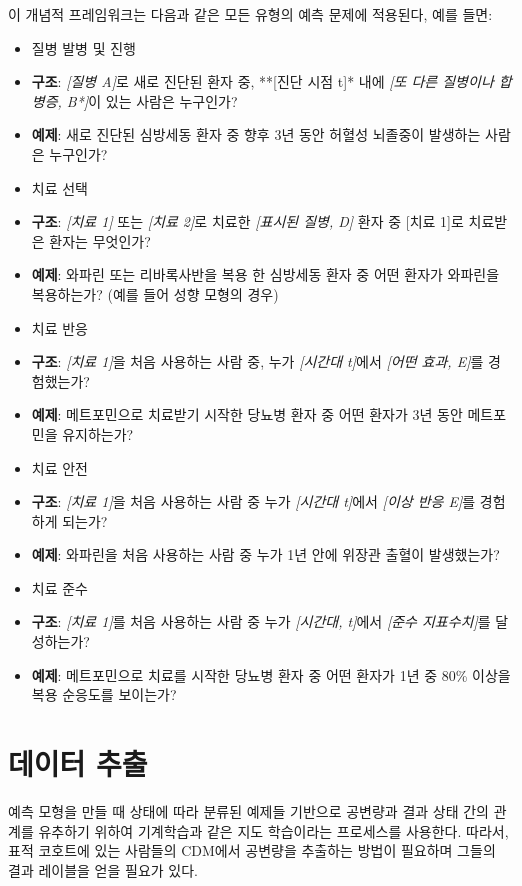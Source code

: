 \documentclass[11pt]{book}
\providecommand{\tightlist}{%
  \setlength{\itemsep}{0pt}\setlength{\parskip}{0pt}}
\theoremstyle{definition}
\theoremstyle{definition}
\theoremstyle{definition}
\theoremstyle{remark}
\begin{document}
이 개념적 프레임워크는 다음과 같은 모든 유형의 예측 문제에 적용된다,
예를 들면:

\begin{itemize}
\tightlist
\item
  질병 발병 및 진행
\item
  \textbf{구조}: \emph{{[}질병 A{]}}로 새로 진단된 환자 중, **{[}진단
  시점 t{]}* 내에 \emph{{[}또 다른 질병이나 합병증, B*{]}}이 있는 사람은
  누구인가?
\item
  \textbf{예제}: 새로 진단된 심방세동 환자 중 향후 3년 동안 허혈성
  뇌졸중이 발생하는 사람은 누구인가?
\item
  치료 선택
\item
  \textbf{구조}: \emph{{[}치료 1{]}} 또는 \emph{{[}치료 2{]}}로 치료한
  \emph{{[}표시된 질병, D{]}} 환자 중 {[}치료 1{]}로 치료받은 환자는
  무엇인가?
\item
  \textbf{예제}: 와파린 또는 리바록사반을 복용 한 심방세동 환자 중 어떤
  환자가 와파린을 복용하는가? (예를 들어 성향 모형의 경우)
\item
  치료 반응
\item
  \textbf{구조}: \emph{{[}치료 1{]}}을 처음 사용하는 사람 중, 누가
  \emph{{[}시간대 t{]}}에서 \emph{{[}어떤 효과, E{]}}를 경험했는가?
\item
  \textbf{예제}: 메트포민으로 치료받기 시작한 당뇨병 환자 중 어떤 환자가
  3년 동안 메트포민을 유지하는가?
\item
  치료 안전
\item
  \textbf{구조}: \emph{{[}치료 1{]}}을 처음 사용하는 사람 중 누가
  \emph{{[}시간대 t{]}}에서 \emph{{[}이상 반응 E{]}}를 경험하게 되는가?
\item
  \textbf{예제}: 와파린을 처음 사용하는 사람 중 누가 1년 안에 위장관
  출혈이 발생했는가?
\item
  치료 준수
\item
  \textbf{구조}: \emph{{[}치료 1{]}}를 처음 사용하는 사람 중 누가
  \emph{{[}시간대, t{]}}에서 \emph{{[}준수 지표수치{]}}를 달성하는가?
\item
  \textbf{예제}: 메트포민으로 치료를 시작한 당뇨병 환자 중 어떤 환자가
  1년 중 80\% 이상을 복용 순응도를 보이는가?
\end{itemize}

\section{데이터 추출}\label{-}

예측 모형을 만들 때 상태에 따라 분류된 예제들 기반으로 공변량과 결과
상태 간의 관계를 유추하기 위하여 기계학습과 같은 지도 학습이라는
프로세스를 사용한다. 따라서, 표적 코호트에
있는 사람들의 CDM에서 공변량을 추출하는 방법이 필요하며 그들의 결과
레이블을 얻을 필요가 있다.
\end{document}
